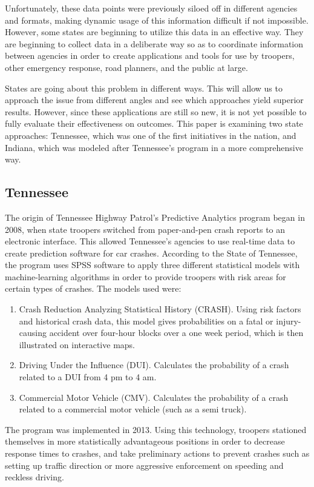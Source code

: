 \documentclass[sigconf]{acmart}
\begin{document}
Unfortunately, these data points were previously siloed off in different agencies and formats, making dynamic usage of this information difficult if not impossible. However, some states are beginning to utilize this data in an effective way. They are beginning to collect data in a deliberate way so as to coordinate information between agencies in order to create applications and tools for use by troopers, other emergency response, road planners, and the public at large. \cite{pew}

States are going about this problem in different ways. This will allow us to approach the issue from different angles and see which approaches yield superior results. However, since these applications are still so new, it is not yet possible to fully evaluate their effectiveness on outcomes. This paper is examining two state approaches: Tennessee, which was one of the first initiatives in the nation, and Indiana, which was modeled after Tennessee's program in a more comprehensive way.

\subsection{Tennessee}
The origin of Tennessee Highway Patrol's Predictive Analytics program began in 2008, when state troopers switched from paper-and-pen crash reports to an electronic interface. This allowed Tennessee's agencies to use real-time data to create prediction software for car crashes. According to the State of Tennessee, the program uses SPSS software to apply three different statistical models with machine-learning algorithms in order to provide troopers with risk areas for certain types of crashes. \cite{tennessee} The models used were:
\begin{enumerate}
    \item Crash Reduction Analyzing Statistical History (CRASH). Using risk factors and historical crash data, this model gives probabilities on a fatal or injury-causing accident over four-hour blocks over a one week period, which is then illustrated on interactive maps.
    \item Driving Under the Influence (DUI). Calculates the probability of a crash related to a DUI from 4 pm to 4 am. 
    \item Commercial Motor Vehicle (CMV). Calculates the probability of a crash related to a commercial motor vehicle (such as a semi truck).\cite{tennessee}
\end{enumerate}
The program was implemented in 2013. Using this technology, troopers stationed themselves in more statistically advantageous positions in order to decrease response times to crashes, and take preliminary actions to prevent crashes such as setting up traffic direction or more aggressive enforcement on speeding and reckless driving. 
\end{document}

